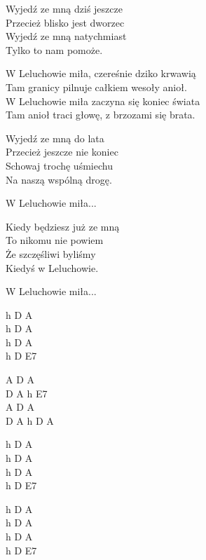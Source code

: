 \begin{text}
    Wyjedź ze mną dziś jeszcze\\
    Przecież blisko jest dworzec\\
    Wyjedź ze mną natychmiast\\
    Tylko to nam pomoże.

    \vin W Leluchowie miła, czereśnie dziko krwawią\\
    \vin Tam granicy pilnuje całkiem wesoły anioł.\\
    \vin W Leluchowie miła zaczyna się koniec świata\\
    \vin Tam anioł traci głowę, z brzozami się brata.

    Wyjedź ze mną do lata\\
    Przecież jeszcze nie koniec\\
    Schowaj trochę uśmiechu\\
    Na naszą wspólną drogę.

    \vin W Leluchowie miła...

    Kiedy będziesz już ze mną\\
    To nikomu nie powiem\\
    Że szczęśliwi byliśmy\\
    Kiedyś w Leluchowie.

    \vin W Leluchowie miła... 
\end{text}
\begin{chord}
    h D A\\
    h D A\\
    h D A\\
    h D E7

    A D A\\
    D A h E7\\
    A D A\\
    D A h D A

    h D A\\
    h D A\\
    h D A\\
    h D E7\\
    \hfill\break

    h D A\\
    h D A\\
    h D A\\
    h D E7
\end{chord}
